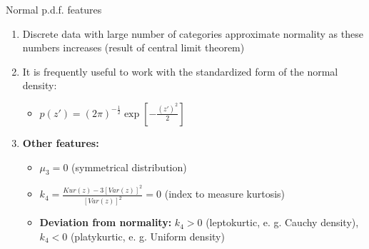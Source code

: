 \documentclass{beamer}
\begin{document}
\begin{frame}{Normal p.d.f. features}
  \begin{enumerate}
  
  \item<1-> Discrete data with large number of categories approximate normality as these numbers increases (result of central limit theorem)
  \vspace{0.2cm}
    
  \item<2-> It is frequently useful to work with the standardized form of the normal density:
  \vspace{0.2cm}
  
  \begin{itemize}
    \item $p(z')= (2 \pi)^{-\frac{1}{2}} \exp\left[ - \frac{(z')^2}{2} \right]$
  \end{itemize}
  \vspace{0.2cm}
  
  \item<3-> \textbf{Other features:} 
  \vspace{0.2cm}
    
  \begin{itemize}
    \item $\mu_{3} = 0$ (symmetrical distribution)
    \vspace{0.2cm}
    
    \item $k_{4} = \frac{Kur(z) - 3\left[Var(z) \right]^2 }{\left[Var(z) \right]^2} = 0$ (index to measure kurtosis)    
    \vspace{0.2cm}
    
    \item \textbf{Deviation from normality:} $k_{4}>0$ (leptokurtic, e. g. Cauchy density), $k_{4}<0$ (platykurtic, e. g. Uniform density)
  \end{itemize}
  \vspace{0.2cm}
           
  \end{enumerate}
    
\end{frame}

\end{document}
